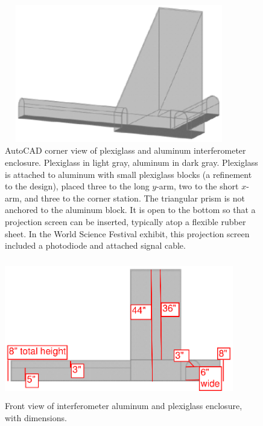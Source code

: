         \begin{figure}
        \begin{center}
        \includegraphics[height=60mm, width=100mm]{view-corner.eps}
        \caption{AutoCAD corner view of plexiglass and aluminum interferometer enclosure. Plexiglass in light gray, aluminum in dark gray. Plexiglass is attached to aluminum with small plexiglass blocks (a refinement to the design), placed three to the long $y$-arm, two to the short $x$-arm, and three to the corner station. The triangular prism is not anchored to the aluminum block. It is open to the bottom so that a projection screen can be inserted, typically atop a flexible rubber sheet. In the World Science Festival exhibit, this projection screen included a photodiode and attached signal cable.}
        \label{plex-view-corner}
        \end{center}
        \end{figure}

        \begin{figure}
        \begin{center}
        \includegraphics[height=60mm, width=100mm]{view-front.eps}
        \caption{Front view of interferometer aluminum and plexiglass enclosure, with dimensions.}
        \label{plex-view-front}
        \end{center}
        \end{figure}



